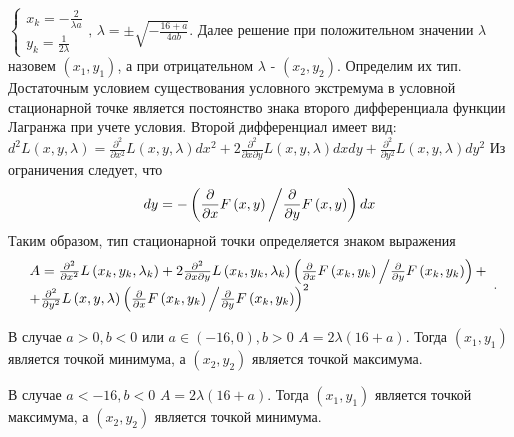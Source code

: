 \documentclass[addpoints, answers]{exam} %
\begin{document}
\begin{questions}
\begin{solution}
 $\left\{\begin{array}{c} {x_{k} =-\frac{2}{\lambda a} } \\ {y_{k} =\frac{1}{2\lambda } } \end{array}\right. ,\, \lambda =\pm \sqrt{-\frac{16+a}{4ab} } $. Далее решение при положительном значении $\lambda $ назовем $\left(x_{1} ,y_{1} \right)$, а при отрицательном $\lambda $ - $\left(x_{2} ,y_{2} \right)$. Определим их тип. Достаточным условием существования условного экстремума в условной стационарной точке является постоянство знака второго дифференциала функции Лагранжа при учете условия. Второй дифференциал имеет вид: $d^{2} L\left(x,y,\lambda \right)=\frac{\partial ^{2} }{\partial x^{2} } L\left(x,y,\lambda \right)dx^{2} +2\frac{\partial ^{2} }{\partial x\partial y} L\left(x,y,\lambda \right)dxdy+\frac{\partial ^{2} }{\partial y^{2} } L\left(x,y,\lambda \right)dy^{2} $ Из ограничения следует, что
\[
dy=-\left({\frac{\partial }{\partial x} F\left(x,y\right) \mathord{\left/{\vphantom{\frac{\partial }{\partial x} F\left(x,y\right) \frac{\partial }{\partial y} F\left(x,y\right)}}\right.\kern-\nulldelimiterspace} \frac{\partial }{\partial y} F\left(x,y\right)} \right)dx
\]
Таким образом, тип стационарной точки определяется знаком выражения
\[
\begin{array}{l} {A=\frac{\partial ^{2} }{\partial x^{2} } L\left(x_{k} ,y_{k} ,\lambda _{k} \right)+2\frac{\partial ^{2} }{\partial x\partial y} L\left(x_{k} ,y_{k} ,\lambda _{k} \right)\left({\frac{\partial }{\partial x} F\left(x_{k} ,y_{k} \right) \mathord{\left/{\vphantom{\frac{\partial }{\partial x} F\left(x_{k} ,y_{k} \right) \frac{\partial }{\partial y} F\left(x_{k} ,y_{k} \right)}}\right.\kern-\nulldelimiterspace} \frac{\partial }{\partial y} F\left(x_{k} ,y_{k} \right)} \right)+} \\ {+\frac{\partial ^{2} }{\partial y^{2} } L\left(x,y,\lambda \right)\left({\frac{\partial }{\partial x} F\left(x_{k} ,y_{k} \right) \mathord{\left/{\vphantom{\frac{\partial }{\partial x} F\left(x_{k} ,y_{k} \right) \frac{\partial }{\partial y} F\left(x_{k} ,y_{k} \right)}}\right.\kern-\nulldelimiterspace} \frac{\partial }{\partial y} F\left(x_{k} ,y_{k} \right)} \right)^{2} } \end{array}.
\]

В случае $a>0,b<0$ или $a\in \left(-16,0\right),b>0$ $A=2\lambda (16+a)$. Тогда $\left(x_{1} ,y_{1} \right)$ является точкой минимума, а $\left(x_{2} ,y_{2} \right)$ является точкой максимума.

В случае $a<-16,b<0$ $A=2\lambda (16+a)$. Тогда $\left(x_{1} ,y_{1} \right)$ является точкой максимума, а $\left(x_{2} ,y_{2} \right)$ является точкой минимума.


\end{solution}
\end{questions}
\end{document}
